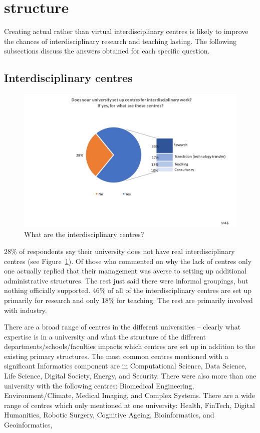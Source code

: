 \section{structure}

Creating actual rather than virtual interdisciplinary centres is likely to improve the chances of interdisciplinary research and teaching lasting. The following subsections discuss the answers obtained for each specific question.


\subsection{Interdisciplinary centres}

\begin{figure}[h]
\centering
\includegraphics[width = \linewidth]{charts/5a.jpg}
\caption{What are the interdisciplinary centres?}
\label{sect5:centres}
\end{figure}

28\% of respondents say their university does not have real interdisciplinary centres (see Figure~\ref{sect5:centres}). Of those who commented on why the lack of centres only one actually replied that their management was averse to setting up additional administrative structures. The rest just said there were informal groupings, but nothing officially supported. 46\% of all of the interdisciplinary centres are set up primarily for research and only 18\% for teaching. The rest are primarily involved with industry.

There are a broad range of centres in the different universities -- clearly what expertise is in a university and what the structure of the different departments/schools/faculties impacts which centres are set up in addition to the existing primary structures. The most common centres mentioned with a significant Informatics component are in Computational Science, Data Science,  Life Science, Digital Society, Energy, and Security.   There were also more than one university with the following centres: Biomedical Engineering, Environment/Climate,  Medical Imaging, and  Complex Systems. There are a wide range of centres which only mentioned at one university: Health,  FinTech, Digital Humanities, Robotic Surgery, Cognitive Ageing, Bioinformatics, and Geoinformatics, 
 


